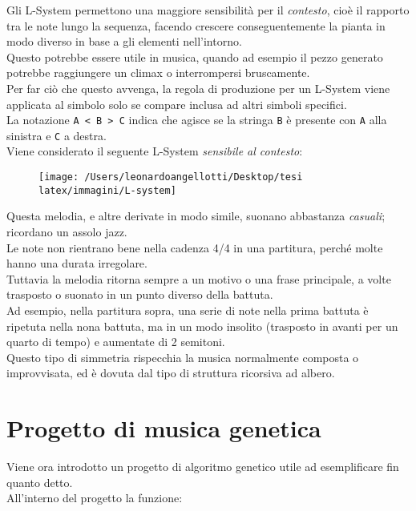 \documentclass[a4paper,12pt]{report}
\begin{document}
Gli L-System permettono una maggiore sensibilità per il \textit{contesto}, cioè il rapporto tra le note lungo la sequenza, 
facendo crescere conseguentemente la pianta in modo diverso in base a gli elementi nell'intorno. \\
Questo potrebbe essere utile in musica, quando ad esempio il pezzo generato potrebbe raggiungere un climax o interrompersi bruscamente. \\
Per far ciò che questo avvenga, la regola di produzione per un L-System viene applicata al simbolo solo se compare inclusa ad altri simboli specifici. \\
La notazione \texttt{A < B > C} indica che agisce se la stringa \texttt{B} è presente con \texttt{A} alla sinistra e \texttt{C} a destra. \\
Viene considerato il seguente L-System \textit{sensibile al contesto}: 

\begin{figure}[H]
    \centering
    \texttt{[image: /Users/leonardoangellotti/Desktop/tesi latex/immagini/L-system]} 
    \label{fig:immagine8}
\end{figure}

Questa melodia, e altre derivate in modo simile, suonano abbastanza \textit{casuali}; ricordano un assolo jazz. \\
Le note non rientrano bene nella cadenza 4/4 in una partitura, perché molte hanno una durata irregolare. \\
Tuttavia la melodia ritorna sempre a un motivo o una frase principale, a volte trasposto o suonato in un punto diverso della battuta. \\
Ad esempio, nella partitura sopra, una serie di note nella prima battuta è ripetuta nella nona battuta, ma in un modo insolito (trasposto in avanti per un quarto di tempo) e aumentate di 2 semitoni. \\
Questo tipo di simmetria rispecchia la musica normalmente composta o improvvisata, ed è dovuta dal tipo di struttura ricorsiva ad albero. 

\chapter{Progetto di musica genetica}

Viene ora introdotto un progetto di algoritmo genetico utile ad esemplificare fin quanto detto. \\
All'interno del progetto la funzione: \\
\end{document}
